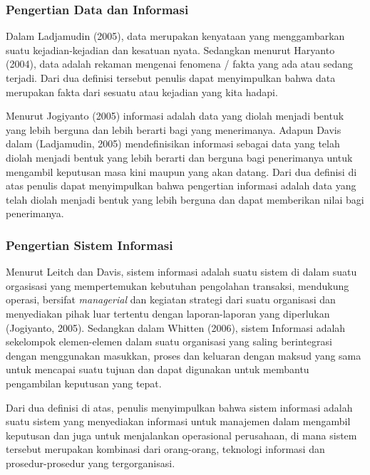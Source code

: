     \subsubsection{Pengertian Data dan Informasi}
    Dalam Ladjamudin (2005), data merupakan kenyataan yang menggambarkan suatu kejadian-kejadian dan kesatuan nyata. Sedangkan menurut Haryanto (2004), data adalah rekaman mengenai fenomena / fakta yang ada atau sedang terjadi. Dari dua definisi tersebut penulis dapat menyimpulkan bahwa data merupakan fakta dari sesuatu atau kejadian yang kita hadapi.

    Menurut Jogiyanto (2005) informasi adalah data yang diolah menjadi bentuk yang lebih berguna dan lebih berarti bagi yang menerimanya. Adapun Davis dalam (Ladjamudin, 2005) mendefinisikan informasi sebagai data yang telah diolah menjadi bentuk yang lebih berarti dan berguna bagi penerimanya untuk mengambil keputusan masa kini maupun yang akan datang. Dari dua definisi di atas penulis dapat menyimpulkan bahwa pengertian informasi adalah data yang telah diolah menjadi bentuk yang lebih berguna dan dapat memberikan nilai bagi penerimanya.

    \subsubsection{Pengertian Sistem Informasi}
    Menurut Leitch dan Davis, sistem informasi adalah suatu sistem di dalam suatu orgasisasi yang mempertemukan kebutuhan pengolahan transaksi, mendukung operasi, bersifat \emph{managerial} dan kegiatan strategi dari suatu organisasi dan menyediakan pihak luar tertentu dengan laporan-laporan yang diperlukan (Jogiyanto, 2005). Sedangkan dalam Whitten (2006), sistem Informasi adalah sekelompok elemen-elemen dalam suatu organisasi yang saling berintegrasi dengan menggunakan masukkan, proses dan keluaran dengan maksud yang sama untuk mencapai suatu tujuan dan dapat digunakan untuk membantu pengambilan keputusan yang tepat.
    
    Dari dua definisi di atas, penulis menyimpulkan bahwa sistem informasi adalah suatu sistem yang menyediakan informasi untuk manajemen dalam mengambil keputusan dan juga untuk menjalankan operasional perusahaan, di mana sistem tersebut merupakan kombinasi dari orang-orang, teknologi informasi dan prosedur-prosedur yang tergorganisasi.
    
